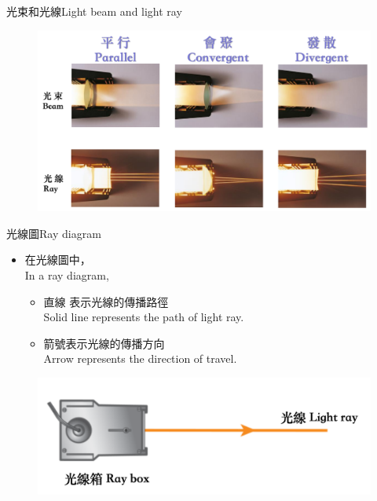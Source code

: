 \documentclass[beamer=true]{standalone}
\begin{document}
\begin{frame}{光束和光線Light beam and light ray}
    \begin{figure}
        \centering
        \includegraphics[width=1\linewidth]{assets/dwepdowedewdkewkge.png}
        
        
    \end{figure}
\end{frame}

\begin{frame}{光線圖Ray diagram}
\begin{itemize}
    \item 在光線圖中，\\In a ray diagram,
    \begin{itemize}
        \item 直線  表示光線的傳播路徑\\Solid line represents the path of light ray.
        \item 箭號表示光線的傳播方向\\Arrow represents the direction of travel.
    \end{itemize}
\end{itemize}\medskip
\begin{figure}
    \centering
    \includegraphics[width=0.666\linewidth]{assets/djdjweodjowiediowejdioew.png}
\end{figure}
\end{frame}
\end{document}
